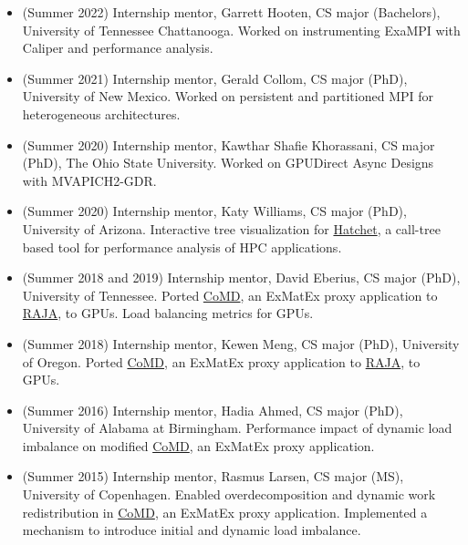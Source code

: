 {\begin{itemize}
		\item (Summer 2022) Internship mentor, Garrett Hooten, CS major (Bachelors), University of Tennessee Chattanooga.
		  Worked on instrumenting ExaMPI with Caliper and performance analysis.  
		\item (Summer 2021) Internship mentor, Gerald Collom, CS major (PhD), University of New Mexico.
		  Worked on persistent and partitioned MPI for heterogeneous architectures.		
	        \item (Summer 2020) Internship mentor, Kawthar Shafie Khorassani, CS major (PhD), The Ohio State University.
		  Worked on GPUDirect Async Designs with MVAPICH2-GDR.
        		\item (Summer 2020) Internship mentor, Katy Williams, CS major (PhD), University of Arizona.
		  Interactive tree visualization for \href{https://llnl-hatchet.readthedocs.io/en/latest/}{Hatchet},
	          a call-tree based tool for performance analysis of HPC applications.	          
		\item (Summer 2018 and 2019) Internship mentor, David Eberius, CS major (PhD), University of Tennessee.
		  Ported \href{http://www.exmatex.org/comd.html}{CoMD}, an ExMatEx proxy application to
		  \href{https://github.com/LLNL/RAJA}{RAJA}, to GPUs.
		  Load balancing metrics for GPUs.
		\item (Summer 2018) Internship mentor, Kewen Meng, CS major (PhD), University of Oregon.
		  Ported \href{http://www.exmatex.org/comd.html}{CoMD}, an ExMatEx proxy application to
		  \href{https://github.com/LLNL/RAJA}{RAJA}, to GPUs.
		\item (Summer 2016) Internship mentor, Hadia Ahmed, CS major (PhD), University of Alabama at Birmingham.
		  Performance impact of dynamic load imbalance on modified 
		  \href{http://www.exmatex.org/comd.html}{CoMD}, an ExMatEx proxy application.
		\item (Summer 2015) Internship mentor, Rasmus Larsen, CS major (MS), University of Copenhagen. %
		  Enabled overdecomposition and dynamic work redistribution in
		  \href{http://www.exmatex.org/comd.html}{CoMD}, an ExMatEx proxy application.
		  Implemented a mechanism to introduce initial and dynamic load imbalance.
		\end{itemize}
	}
